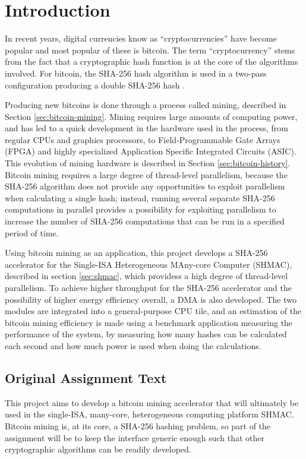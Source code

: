 \chapter{Introduction}

In recent years, digital currencies know as ``cryptocurrencies'' have become popular
and most popular of these is bitcoin. The term ``cryptocurrency'' stems from the fact
that a cryptographic hash function is at the core of the algorithms involved. For bitcoin,
the SHA-256 hash algorithm is used in a two-pass configuration producing a double SHA-256
hash \cite{bitcoin}.

Producing new bitcoins is done through a process called mining, described in Section \ref{sec:bitcoin-mining}.
Mining requires large amounts of computing power, and has led to a quick development in
the hardware used in the process, from regular CPUs and graphics processors, to Field-Programmable Gate Arrays (FPGA) and highly specialized Application Specific
Integrated Circuits (ASIC). This evolution of mining hardware is described in Section \ref{sec:bitcoin-history}.
Bitcoin mining requires a large degree of thread-level parallelism, because the SHA-256
algorithm does not provide any opportunities to exploit parallelism when calculating a single hash;
instead, running several separate SHA-256 computations in parallel provides a possibility for
exploiting parallelism to increase the number of SHA-256 computations that can be run in a specified period of time.

Using bitcoin mining as an application, this project develops a SHA-256 accelerator
for the Single-ISA Heterogeneous MAny-core Computer (SHMAC), described in section \ref{sec:shmac},
which providess a high degree of thread-level parallelism. To achieve higher throughput for the
SHA-256 accelerator and the possibility of higher energy efficiency overall, a DMA is also
developed. The two modules are integrated into a general-purpose CPU tile, and an estimation
of the bitcoin mining efficiency is made using a benchmark application measuring the performance
of the system, by measuring how many hashes can be calculated each second and how much power
is used when doing the calculations.

\section{Original Assignment Text}

This project aims to develop a bitcoin mining accelerator that will ultimately be
used in the single-ISA, many-core, heterogeneous computing platform SHMAC. Bitcoin
mining is, at its core, a SHA-256 hashing problem, so part of the assignment will
be to keep the interface generic enough such that other cryptographic algorithms
can be readily developed.

